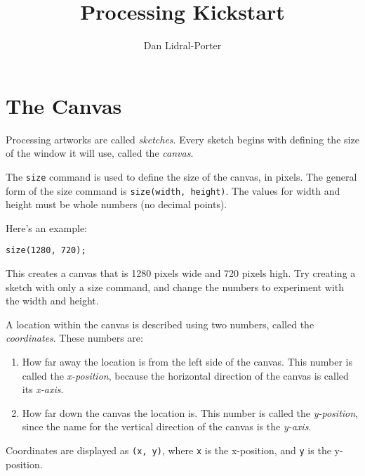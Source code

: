 \documentclass[
]{leaflet}
\title{Processing Kickstart\vspace{-2ex}}
\author{%
  Dan Lidral-Porter\vspace{-2ex}
}
\begin{document}


\maketitle
\thispagestyle{empty}


\section{The Canvas}

Processing artworks are called \textit{sketches}.
Every sketch begins with defining the size of the window it will use, called the \textit{canvas}.

The \texttt{size} command is used to define the size of the canvas, in pixels.
The general form of the size command is \texttt{size(width, height)}.
The values for width and height must be whole numbers (no decimal points).

Here's an example:

\begin{lstlisting}
size(1280, 720);
\end{lstlisting}

This creates a canvas that is 1280 pixels wide and 720 pixels high.
Try creating a sketch with only a size command, and change the numbers to experiment with the width and height.

A location within the canvas is described using two numbers, called the \textit{coordinates}.
These numbers are:

\begin{enumerate}
  \item How far away the location is from the left side of the canvas.
        This number is called the \textit{x-position}, because the horizontal direction of the canvas is called its \textit{x-axis}.

  \item How far down the canvas the location is.
        This number is called the \textit{y-position}, since the name for the vertical direction of the canvas is the \textit{y-axis}.
\end{enumerate}

Coordinates are displayed as \texttt{(x, y)}, where \texttt{x} is the x-position, and \texttt{y} is the y-position.
\end{document}
